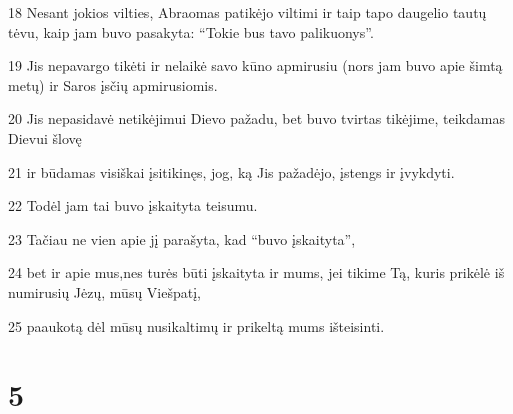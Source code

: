 \par 18 Nesant jokios vilties, Abraomas patikėjo viltimi ir taip tapo daugelio tautų tėvu, kaip jam buvo pasakyta: “Tokie bus tavo palikuonys”. 
\par 19 Jis nepavargo tikėti ir nelaikė savo kūno apmirusiu (nors jam buvo apie šimtą metų) ir Saros įsčių apmirusiomis. 
\par 20 Jis nepasidavė netikėjimui Dievo pažadu, bet buvo tvirtas tikėjime, teikdamas Dievui šlovę 
\par 21 ir būdamas visiškai įsitikinęs, jog, ką Jis pažadėjo, įstengs ir įvykdyti. 
\par 22 Todėl jam tai buvo įskaityta teisumu. 
\par 23 Tačiau ne vien apie jį parašyta, kad “buvo įskaityta”, 
\par 24 bet ir apie mus,­nes turės būti įskaityta ir mums, jei tikime Tą, kuris prikėlė iš numirusių Jėzų, mūsų Viešpatį, 
\par 25 paaukotą dėl mūsų nusikaltimų ir prikeltą mums išteisinti.


\chapter{5}


